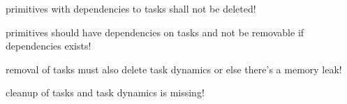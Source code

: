 
\begin{DoxyRefList}
\item[\label{todo__todo000002}%
\hypertarget{todo__todo000002}{}%
Member \hyperlink{classhiqp_1_1geometric__primitives_1_1GeometricPrimitiveMap_aed92b78b51ccd075d226b003f9576476}{hiqp\-:\-:geometric\-\_\-primitives\-:\-:Geometric\-Primitive\-Map\-:\-:clear} ()]primitives with dependencies to tasks shall not be deleted!  
\item[\label{todo__todo000001}%
\hypertarget{todo__todo000001}{}%
Member \hyperlink{classhiqp_1_1geometric__primitives_1_1GeometricPrimitiveMap_a07d04c1a3bb164bb501bd03cc6bc1eae}{hiqp\-:\-:geometric\-\_\-primitives\-:\-:Geometric\-Primitive\-Map\-:\-:remove\-Geometric\-Primitive} (std\-::string name)]primitives should have dependencies on tasks and not be removable if dependencies exists!  
\item[\label{todo__todo000004}%
\hypertarget{todo__todo000004}{}%
Member \hyperlink{classhiqp_1_1TaskManager_a1f58d497fa59e23506e6d7d60fe3693d}{hiqp\-:\-:Task\-Manager\-:\-:remove\-Task} (std\-::string task\-\_\-name)]removal of tasks must also delete task dynamics or else there's a memory leak!  
\item[\label{todo__todo000003}%
\hypertarget{todo__todo000003}{}%
Member \hyperlink{classhiqp_1_1TaskManager_a688ad548e2ef681b458c1fc90326f6e6}{hiqp\-:\-:Task\-Manager\-:\-:$\sim$\-Task\-Manager} () noexcept]cleanup of tasks and task dynamics is missing! 
\end{DoxyRefList}